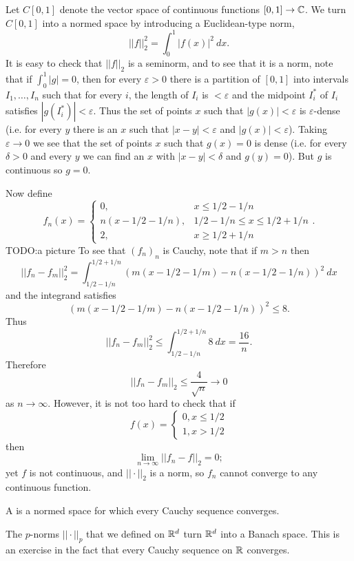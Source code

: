 \begin{example}
Let $C[0, 1]$ denote the vector space of continuous functions $[0, 1] \to \mathbb{C}$.
We turn $C[0, 1]$ into a normed space by introducing a Euclidean-type norm,
\[||f||_2^2 = \int_0^1 |f(x)|^2 ~dx.\]
It is easy to check that $||f||_2$ is a seminorm, and to see that it is a norm, note that if $\int_0^1 |g| = 0$, then for every $\varepsilon > 0$ there is a partition of $[0, 1]$ into intervals $I_1, \dots, I_{n}$ such that for every $i$, the length of $I_i$ is $<\varepsilon$ and the midpoint $I_i^*$ of $I_i$ satisfies $|g(I_i^*)| < \varepsilon$.
Thus the set of points $x$ such that $|g(x)| < \varepsilon$ is $\varepsilon$-dense (i.e. for every $y$ there is an $x$ such that $|x - y| < \varepsilon$ and $|g(x)| < \varepsilon$).
Taking $\varepsilon \to 0$ we see that the set of points $x$ such that $g(x) = 0$ is dense (i.e. for every $\delta > 0$ and every $y$ we can find an $x$ with $|x - y| < \delta$ and $g(y) = 0$).
But $g$ is continuous so $g = 0$.

Now define
$$f_{n}(x) = \begin{cases}
0, &x \leq 1/2 - 1/n\\
n(x - 1/2 - 1/n), &1/2 - 1/n \leq x \leq 1/2 + 1/n\\
2, &x \geq 1/2 + 1/n
\end{cases}.$$
TODO:\@Draw a picture
To see that ${(f_{n})}_{n}$ is Cauchy, note that if $m > n$ then
\[||f_{n} - f_{m}||_2^2 = \int_{1/2-1/n}^{1/2+1/n} {(m(x - 1/2 - 1/m) - n(x - 1/2 - 1/n))}^2~dx\]
and the integrand satisfies
\[{(m(x - 1/2 - 1/m) - n(x - 1/2 - 1/n))}^2 \leq 8.\]
Thus
\[||f_{n} - f_{m}||_2^2 \leq \int_{1/2-1/n}^{1/2+1/n} 8~dx = \frac{16}{n}.\]
Therefore
\[||f_{n} - f_{m}||_2 \leq \frac{4}{\sqrt n} \to 0\]
as $n \to \infty$. However, it is not too hard to check that if
$$f(x) = \begin{cases}
0, x \leq 1/2\\
1, x > 1/2
\end{cases}$$
then
\[\lim_{n \to \infty} ||f_{n} - f||_2 = 0;\]
yet $f$ is not continuous, and $||\cdot||_2$ is a norm, so $f_{n}$ cannot converge to any continuous function.
\end{example}

\begin{definition}
A  is a normed space for which every Cauchy sequence converges.
\end{definition}

\begin{example}
The $p$-norms $||\cdot||_{p} $ that we defined on $\mathbb{R}^d$ turn $\mathbb{R}^d$ into a Banach space.
This is an exercise in the fact that every Cauchy sequence on $\mathbb{R}$ converges.
\end{example}

